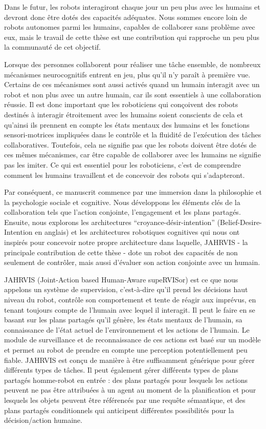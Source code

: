 \documentclass[english,a4paper,11pt,twoside]{StyleThese}
\begin{document}
Dans le futur, les robots interagiront chaque jour un peu plus avec les humains et devront donc être dotés des capacités adéquates. Nous sommes encore loin de robots autonomes parmi les humains, capables de collaborer sans problème avec eux, mais le travail de cette thèse est une contribution qui rapproche un peu plus la communauté de cet objectif. 


Lorsque des personnes collaborent pour réaliser une tâche ensemble, de nombreux mécanismes neurocognitifs entrent en jeu, plus qu’il n’y paraît à première vue. Certains de ces mécanismes sont aussi activés quand un humain interagit avec un robot et non plus avec un autre humain, car ils sont essentiels à une collaboration réussie. Il est donc important que les roboticiens qui conçoivent des robots destinés à interagir étroitement avec les humains soient conscients de cela et qu’ainsi ils prennent en compte les états mentaux des humains et les fonctions sensori-motrices impliquées dans le contrôle et la fluidité de l'exécution des tâches collaboratives. Toutefois, cela ne signifie pas que les robots doivent être dotés de ces mêmes mécanismes, car être capable de collaborer avec les humains ne signifie pas les imiter. Ce qui est essentiel pour les roboticiens, c'est de comprendre comment les humains travaillent et de concevoir des robots qui s'adapteront. 


Par conséquent, ce manuscrit commence par une immersion dans la philosophie et la psychologie sociale et cognitive. Nous développons les éléments clés de la collaboration tels que l'action conjointe, l'engagement et les plans partagés. Ensuite, nous explorons les architectures “croyance-désir-intention” (Belief-Desire-Intention en anglais) et les architectures robotiques cognitives qui nous ont inspirés pour concevoir notre propre architecture dans laquelle, JAHRVIS - la principale contribution de cette thèse - dote un robot des capacités de non seulement de contrôler, mais aussi d'évaluer son action conjointe avec un humain. 


JAHRVIS (Joint-Action based Human-Aware supeRVISor) est ce que nous appelons un système de supervision, c'est-à-dire qu'il prend les décisions haut niveau du robot, contrôle son comportement et tente de réagir aux imprévus, en tenant toujours compte de l'humain avec lequel il interagit. Il peut le faire en se basant sur les plans partagés qu’il génère, les états mentaux de l'humain, sa connaissance de l'état actuel de l'environnement et les actions de l'humain. Le module de surveillance et de reconnaissance de ces actions est basé sur un modèle et permet au robot de prendre en compte une perception potentiellement peu fiable. JAHRVIS est conçu de manière à être suffisamment générique pour gérer différents types de tâches. Il peut également gérer différents types de plans partagés homme-robot en entrée : des plans partagés pour lesquels les actions peuvent ne pas être attribuées à un agent au moment de la planification et pour lesquels les objets peuvent être référencés par une requête sémantique, et des plans partagés conditionnels qui anticipent différentes possibilités pour la décision/action humaine. 
\end{document}
